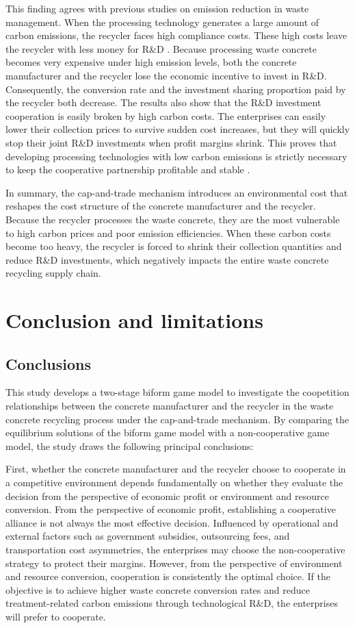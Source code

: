 \documentclass[authoryear,preprint,review,times,10pt]{elsarticle}
\begin{document}
This finding agrees with previous studies on emission reduction in waste management. When the processing technology generates a large amount of carbon emissions, the recycler faces high compliance costs. These high costs leave the recycler with less money for R\&D \citep{besklubova2026Establishing}. Because processing waste concrete becomes very expensive under high emission levels, both the concrete manufacturer and the recycler lose the economic incentive to invest in R\&D. Consequently, the conversion rate and the investment sharing proportion paid by the recycler both decrease. The results also show that the R\&D investment cooperation is easily broken by high carbon costs. The enterprises can easily lower their collection prices to survive sudden cost increases, but they will quickly stop their joint R\&D investments when profit margins shrink. This proves that developing processing technologies with low carbon emissions is strictly necessary to keep the cooperative partnership profitable and stable \citep{chen2025Lowcarbon}.

In summary, the cap-and-trade mechanism introduces an environmental cost that reshapes the cost structure of the concrete manufacturer and the recycler. Because the recycler processes the waste concrete, they are the most vulnerable to high carbon prices and poor emission efficiencies. When these carbon costs become too heavy, the recycler is forced to shrink their collection quantities and reduce R\&D investments, which negatively impacts the entire waste concrete recycling supply chain.

\section{Conclusion and limitations}
\subsection{Conclusions}

This study develops a two-stage biform game model to investigate the coopetition relationships between the concrete manufacturer and the recycler in the waste concrete recycling process under the cap-and-trade mechanism. By comparing the equilibrium solutions of the biform game model with a non-cooperative game model, the study draws the following principal conclusions:

First, whether the concrete manufacturer and the recycler choose to cooperate in a competitive environment depends fundamentally on whether they evaluate the decision from the perspective of economic profit or environment and resource conversion. From the perspective of economic profit, establishing a cooperative alliance is not always the most effective decision. Influenced by operational and external factors such as government subsidies, outsourcing fees, and transportation cost asymmetries, the enterprises may choose the non-cooperative strategy to protect their margins. However, from the perspective of environment and resource conversion, cooperation is consistently the optimal choice. If the objective is to achieve higher waste concrete conversion rates and reduce treatment-related carbon emissions through technological R\&D, the enterprises will prefer to cooperate.
\end{document}
